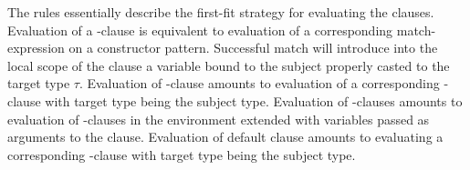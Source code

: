 The rules essentially describe the first-fit strategy for evaluating the clauses.
Evaluation of a -clause is equivalent to evaluation of a corresponding 
match-expression on a constructor pattern. Successful match will introduce into 
the local scope of the clause a variable  bound to the subject 
properly casted to the target type $\tau$. Evaluation of -clause 
amounts to evaluation of a corresponding -clause with target type 
being the subject type. Evaluation of -clauses amounts to evaluation 
of -clauses in the environment extended with variables passed as 
arguments to the clause. Evaluation of default clause amounts to evaluating a 
corresponding -clause with target type being the subject type.

